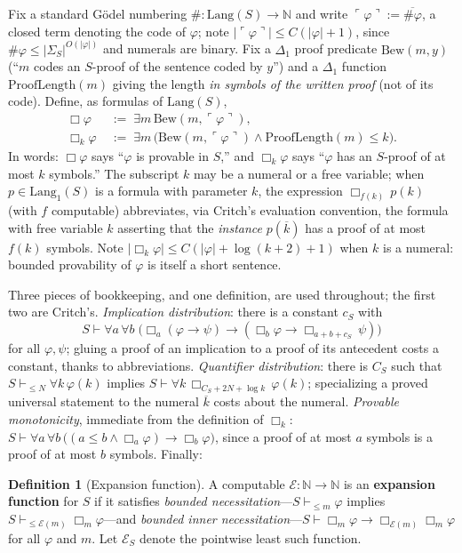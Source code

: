 \documentclass[11pt]{amsart}
\theoremstyle{plain}
\theoremstyle{definition}
\newtheorem{definition}[theorem]{Definition}
\newcommand{\Lang}{\mathrm{Lang}}
\newcommand{\gn}[1]{\ulcorner #1 \urcorner}
\newcommand{\num}[1]{\overline{#1}}
\begin{document}
Fix a standard G\"odel numbering $\#\colon \Lang(S) \to \mathbb{N}$ and write $\gn{\varphi} := \num{\#\varphi}$, a closed term denoting the code of $\varphi$; note $|\gn{\varphi}| \le C(|\varphi|+1)$, since $\#\varphi \le |\Sigma_S|^{O(|\varphi|)}$ and numerals are binary. Fix a $\Delta_1$ proof predicate $\mathrm{Bew}(m,y)$ (``$m$ codes an $S$-proof of the sentence coded by $y$'') and a $\Delta_1$ function $\mathrm{ProofLength}(m)$ giving the length \emph{in symbols of the written proof} (not of its code). Define, as formulas of $\Lang(S)$,
\[
\begin{aligned}
\Box \varphi
  &\;:=\; \exists m\, \mathrm{Bew}(m, \gn{\varphi}),\\
\Box_k \varphi
  &\;:=\; \exists m\, \bigl(\mathrm{Bew}(m, \gn{\varphi})
       \wedge \mathrm{ProofLength}(m) \le k\bigr).
\end{aligned}
\]
In words: $\Box\varphi$ says ``$\varphi$ is provable in $S$,'' and $\Box_k \varphi$ says ``$\varphi$ has an $S$-proof of at most $k$ symbols.'' The subscript $k$ may be a numeral or a free variable; when $p \in \Lang_1(S)$ is a formula with parameter $k$, the expression $\Box_{f(k)}\, p(k)$ (with $f$ computable) abbreviates, via Critch's evaluation convention, the formula with free variable $k$ asserting that the \emph{instance} $p(\num{k})$ has a proof of at most $f(k)$ symbols. Note $|\Box_k\varphi| \le C(|\varphi| + \log(k+2) + 1)$ when $k$ is a numeral: bounded provability of $\varphi$ is itself a short sentence.

Three pieces of bookkeeping, and one definition, are used throughout; the first two are Critch's. \emph{Implication distribution}: there is a constant $c_S$ with
\[
S \vdash \forall a\,\forall b\;\bigl(\Box_a(\varphi \to \psi) \to (\Box_b \varphi \to \Box_{a+b+c_S}\, \psi)\bigr)
\]
for all $\varphi,\psi$; gluing a proof of an implication to a proof of its antecedent costs a constant, thanks to abbreviations. \emph{Quantifier distribution}: there is $C_S$ such that $S \vdash_{\le N} \forall k\, \varphi(k)$ implies $S \vdash \forall k\, \Box_{C_S + 2N + \log k}\, \varphi(k)$; specializing a proved universal statement to the numeral $\num{k}$ costs about the numeral. \emph{Provable monotonicity}, immediate from the definition of $\Box_k$: $S \vdash \forall a\,\forall b\,\bigl((a \le b \wedge \Box_a\varphi) \to \Box_b\varphi\bigr)$, since a proof of at most $a$ symbols is a proof of at most $b$ symbols. Finally:

\begin{definition}[Expansion function]
\label{def:expansion}
A computable $\mathcal{E}\colon \mathbb{N} \to \mathbb{N}$ is an \textbf{expansion function} for $S$ if it satisfies \emph{bounded necessitation}---$S \vdash_{\le m} \varphi$ implies $S \vdash_{\le \mathcal{E}(m)} \Box_m \varphi$---and \emph{bounded inner necessitation}---$S \vdash \Box_m \varphi \to \Box_{\mathcal{E}(m)} \Box_m \varphi$ for all $\varphi$ and $m$. Let $\mathcal{E}_S$ denote the pointwise least such function.
\end{definition}
\end{document}
